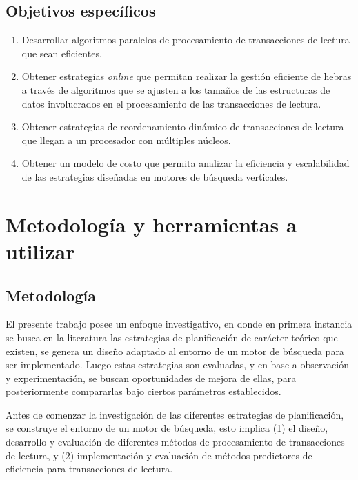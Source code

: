 \subsection{Objetivos específicos}
\label{intro:objetivosespecificos}
\begin{enumerate}	
	\item Desarrollar algoritmos paralelos de procesamiento de transacciones de lectura que sean eficientes.
	
	\item Obtener estrategias \textit{online} que permitan realizar la gestión eficiente de hebras a través de algoritmos que se ajusten a los tamaños de las estructuras de datos involucrados en el procesamiento de las transacciones de lectura.
    
    \item Obtener estrategias de reordenamiento dinámico de transacciones de lectura que llegan a un procesador con múltiples núcleos.
    
    \item Obtener un modelo de costo que permita analizar la eficiencia y escalabilidad de las estrategias diseñadas en motores de búsqueda verticales.
\end{enumerate}

\section{Metodología y herramientas a utilizar}
\label{intro:metodologiayherramientas}

\subsection{Metodología}
\label{intro:metodologia}
El presente trabajo posee un enfoque investigativo, en donde en primera instancia se busca en la literatura las estrategias de planificación de carácter teórico que existen, se genera un diseño adaptado al entorno de un motor de búsqueda para ser implementado. Luego estas estrategias son evaluadas, y en base a observación y experimentación, se buscan oportunidades de mejora de ellas, para posteriormente compararlas bajo ciertos parámetros establecidos.

Antes de comenzar la investigación de las diferentes estrategias de planificación, se construye el entorno de un motor de búsqueda, esto implica (1) el diseño, desarrollo y evaluación de diferentes métodos de procesamiento de transacciones de lectura, y (2) implementación y evaluación de métodos predictores de eficiencia para transacciones de lectura.

